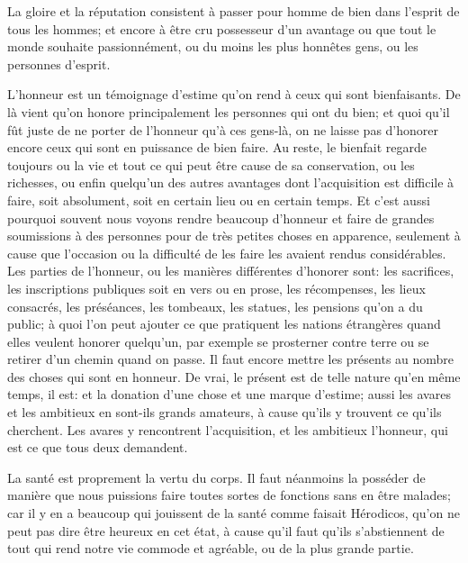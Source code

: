 \bigbreak

La gloire et la réputation consistent à passer pour homme de bien dans l'esprit de tous les hommes; et encore à être cru possesseur
d'un avantage ou que tout le monde souhaite passionnément, ou du moins les plus honnêtes gens, ou les personnes d'esprit. 

L'honneur est un témoignage d'estime qu'on rend à ceux qui sont bienfaisants. De là vient qu'on honore principalement les personnes
qui ont du bien; et quoi qu'il fût juste de ne porter de l'honneur qu'à ces gens-là, on ne laisse pas d'honorer encore ceux qui sont
en puissance de bien faire. Au reste, le bienfait regarde toujours ou la vie et tout ce qui peut être cause de sa conservation, ou les
richesses, ou enfin quelqu'un des autres avantages dont l'acquisition est difficile à faire, soit absolument, soit en certain lieu ou
en certain temps. Et c'est aussi pourquoi souvent nous voyons rendre beaucoup d'honneur et faire de grandes soumissions à des personnes
pour de très petites choses en apparence, seulement à cause que l'occasion ou la difficulté de les faire les avaient rendus considérables.
Les parties de l'honneur, ou les manières différentes d'honorer sont: les sacrifices, les inscriptions publiques soit en vers ou en prose,
les récompenses, les lieux consacrés, les préséances, les tombeaux, les statues, les pensions qu'on a du public; à quoi l'on peut ajouter
ce que pratiquent les nations étrangères quand elles veulent honorer quelqu'un, par exemple se prosterner contre terre ou se retirer d'un
chemin quand on passe. Il faut encore mettre les présents au nombre des choses qui sont en honneur. De vrai, le présent est de telle nature
qu'en même temps, il est: et la donation d'une chose et une marque d'estime; aussi les avares et les ambitieux en sont-ils grands amateurs,
à cause qu'ils y trouvent ce qu'ils cherchent. Les avares y rencontrent l'acquisition, et les ambitieux l'honneur, qui est ce que tous deux
demandent. 

\bigbreak

La santé est proprement la vertu du corps. Il faut néanmoins la posséder de manière que nous puissions faire toutes sortes
de fonctions sans en être malades; car il y en a beaucoup qui jouissent de la santé comme faisait Hérodicos, qu'on ne peut
pas dire être heureux en cet état, à cause qu'il faut qu'ils s'abstiennent de tout qui rend notre vie commode et agréable,
ou de la plus grande partie.

\bigbreak

